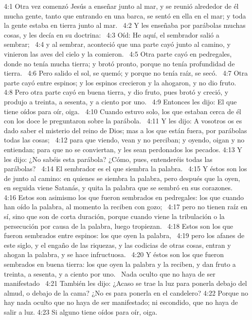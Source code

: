 4:1 Otra vez comenzó Jesús a enseñar junto al mar, y se reunió alrededor de él mucha gente, tanto que entrando en una barca, se sentó en ella en el mar; y toda la gente estaba en tierra junto al mar.  
4:2 Y les enseñaba por parábolas muchas cosas, y les decía en su doctrina:  
4:3 Oíd: He aquí, el sembrador salió a sembrar;  
4:4 y al sembrar, aconteció que una parte cayó junto al camino, y vinieron las aves del cielo y la comieron.  
4:5 Otra parte cayó en pedregales, donde no tenía mucha tierra; y brotó pronto, porque no tenía profundidad de tierra.  
4:6 Pero salido el sol, se quemó; y porque no tenía raíz, se secó.  
4:7 Otra parte cayó entre espinos; y los espinos crecieron y la ahogaron, y no dio fruto.  
4:8 Pero otra parte cayó en buena tierra, y dio fruto, pues brotó y creció, y produjo a treinta, a sesenta, y a ciento por uno.  
4:9 Entonces les dijo: El que tiene oídos para oír, oiga.  
4:10 Cuando estuvo solo, los que estaban cerca de él con los doce le preguntaron sobre la parábola.  
4:11 Y les dijo: A vosotros os es dado saber el misterio del reino de Dios; mas a los que están fuera, por parábolas todas las cosas;  
4:12 para que viendo, vean y no perciban; y oyendo, oigan y no entiendan; para que no se conviertan, y les sean perdonados los pecados. 
4:13 Y les dijo: ¿No sabéis esta parábola? ¿Cómo, pues, entenderéis todas las parábolas?  
4:14 El sembrador es el que siembra la palabra.  
4:15 Y éstos son los de junto al camino: en quienes se siembra la palabra, pero después que la oyen, en seguida viene Satanás, y quita la palabra que se sembró en sus corazones.  
4:16 Estos son asimismo los que fueron sembrados en pedregales: los que cuando han oído la palabra, al momento la reciben con gozo;  
4:17 pero no tienen raíz en sí, sino que son de corta duración, porque cuando viene la tribulación o la persecución por causa de la palabra, luego tropiezan.  
4:18 Estos son los que fueron sembrados entre espinos: los que oyen la palabra,  
4:19 pero los afanes de este siglo, y el engaño de las riquezas, y las codicias de otras cosas, entran y ahogan la palabra, y se hace infructuosa.  
4:20 Y éstos son los que fueron sembrados en buena tierra: los que oyen la palabra y la reciben, y dan fruto a treinta, a sesenta, y a ciento por uno.  
Nada oculto que no haya de ser manifestado   
4:21 También les dijo: ¿Acaso se trae la luz para ponerla debajo del almud, o debajo de la cama? ¿No es para ponerla en el candelero? 
4:22 Porque no hay nada oculto que no haya de ser manifestado; ni escondido, que no haya de salir a luz. 
4:23 Si alguno tiene oídos para oír, oiga. 

